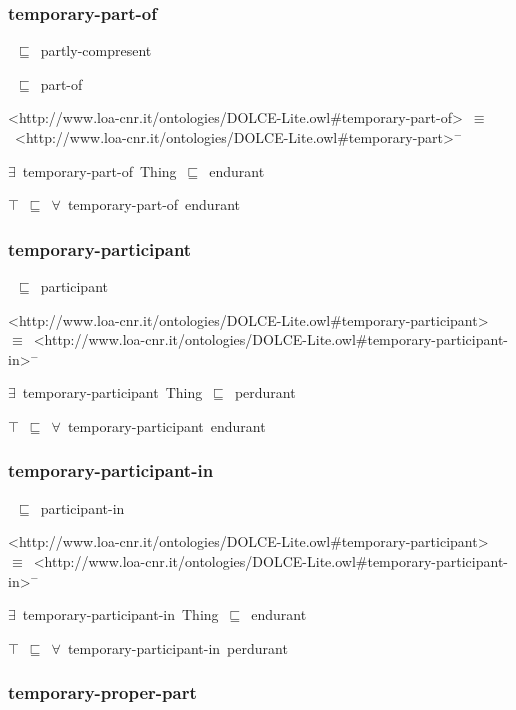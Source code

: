 \documentclass{article}
\begin{document}
\subsubsection*{temporary-part-of}

~\ensuremath{\sqsubseteq}~partly-compresent

~\ensuremath{\sqsubseteq}~part-of

<http://www.loa-cnr.it/ontologies/DOLCE-Lite.owl#temporary-part-of>~\ensuremath{\equiv}~<http://www.loa-cnr.it/ontologies/DOLCE-Lite.owl#temporary-part>\ensuremath{^-}

\ensuremath{\exists}~temporary-part-of~Thing~\ensuremath{\sqsubseteq}~endurant

\ensuremath{\top}~\ensuremath{\sqsubseteq}~\ensuremath{\forall}~temporary-part-of~endurant

\subsubsection*{temporary-participant}

~\ensuremath{\sqsubseteq}~participant

<http://www.loa-cnr.it/ontologies/DOLCE-Lite.owl#temporary-participant>~\ensuremath{\equiv}~<http://www.loa-cnr.it/ontologies/DOLCE-Lite.owl#temporary-participant-in>\ensuremath{^-}

\ensuremath{\exists}~temporary-participant~Thing~\ensuremath{\sqsubseteq}~perdurant

\ensuremath{\top}~\ensuremath{\sqsubseteq}~\ensuremath{\forall}~temporary-participant~endurant

\subsubsection*{temporary-participant-in}

~\ensuremath{\sqsubseteq}~participant-in

<http://www.loa-cnr.it/ontologies/DOLCE-Lite.owl#temporary-participant>~\ensuremath{\equiv}~<http://www.loa-cnr.it/ontologies/DOLCE-Lite.owl#temporary-participant-in>\ensuremath{^-}

\ensuremath{\exists}~temporary-participant-in~Thing~\ensuremath{\sqsubseteq}~endurant

\ensuremath{\top}~\ensuremath{\sqsubseteq}~\ensuremath{\forall}~temporary-participant-in~perdurant

\subsubsection*{temporary-proper-part}
\end{document}

